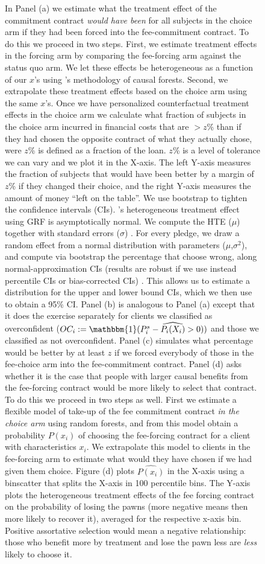 \documentclass[oneside,11pt]{article}
\begin{document}
\begin{figure}[H]
\begin{center}
    \end{center}
        \scriptsize
        In Panel (a) we estimate what the treatment effect of the commitment contract \textit{would have been} for all subjects in the choice arm if they had been forced into the fee-commitment contract. To do this we proceed in two steps. First, we estimate treatment effects in the forcing arm by comparing the fee-forcing arm against the status quo arm. We let these effects be heterogeneous as a function of our $x$'s using \cite{atheygrf}'s methodology of causal forests. Second, we extrapolate these treatment effects based on the choice arm using the same $x$'s. Once we have personalized counterfactual treatment effects in the choice arm we calculate what fraction of subjects in the choice arm incurred in financial costs that are  $> z$\% than if they had chosen the opposite contract of what they actually chose, were $z$\% is defined as a fraction of the loan. $z$\% is a level of tolerance we can vary and we plot it in the X-axis. The left Y-axis measures the fraction of subjects that would have been better by a margin of $z$\% if they changed their choice, and the right Y-axis measures the amount of money ``left on the table''. We use bootstrap to tighten the confidence intervals (CIs). \cite{atheygrf}'s heterogeneous treatment effect using GRF is asymptotically normal. We compute the HTE ($\mu$) together with standard errors ($\sigma$) . For every pledge, we draw a random effect from a normal distribution with parameters ($\mu$,$\sigma^2$), and compute via bootstrap the percentage that choose wrong, along normal-approximation CIs (results are robust if we use instead percentile CIs or bias-corrected CIs) . This allows us to estimate a distribution for the upper and lower bound CIs, which we then use to obtain a 95\% CI. Panel (b) is analogous to Panel (a) except that it does the exercise separately for clients we classified as overconfident ($OC_i:=\mathbbm{1}(P^s_i-\widehat{P_i(X_i)}>0))$ and those we classified as not overconfident. Panel (c) simulates what percentage would be better by at least $z$ if we forced everybody of those in the fee-choice arm into the fee-commitment contract. Panel (d) asks whether it is the case that people with larger causal benefits from the fee-forcing contract would be more likely to select that contract. To do this we proceed in two steps as well. First we estimate a flexible model of take-up of the fee commitment contract \textit{in the choice arm} using random forests, and from this model obtain a probability $P(x_i)$ of choosing the fee-forcing contract for a client with characteristics $x_i$. We extrapolate this model to clients in the fee-forcing arm to estimate what would they have chosen if we had given them choice. Figure (d) plots $\widehat{P(x_i)}$ in the X-axis using a binscatter that splits the X-axis in 100 percentile bins. The Y-axis plots the heterogeneous treatment effects of the fee forcing contract on the probability of losing the pawns (more negative means then more likely to recover it), averaged for the respective x-axis bin. Positive assortative selection would mean a negative relationship: those who benefit more by treatment and lose the pawn less are \emph{less} likely to choose it. 
\end{figure}
\end{document}
